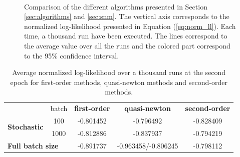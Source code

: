 \documentclass[conference]{IEEEtran}
\begin{document}
\begin{figure}[t]
    \centering
    ~
    ~
    \caption{Comparison of the different algorithms presented in Section \ref{sec:algorithms} and \ref{sec:snm}. The vertical axis corresponds to the normalized log-likelihood presented in Equation (\ref{eq:norm_ll}). Each time, a thousand run have been executed. The lines correspond to the average value over all the runs and the colored part correspond to the 95\% confidence interval.}
    \label{fig:comparison_algo}
    \vspace{-0.5cm}
\end{figure}

\begin{table}
\centering
\renewcommand\arraystretch{1.2}
\begin{tabular}{lc|ccc}
&\multicolumn{1}{c}{batch} & {\bf first-order} & {\bf quasi-newton} & {\bf second-order} \\ \cline{3-5}
\multirow{ 2}{*}{\bf Stochastic} & 100 & -0.801452 & -0.796492 & -0.828409 \\
& 1000 & -0.812886 & -0.837937 & -0.794219 \\
\multicolumn{2}{l|}{\bf Full batch size}  & -0.891737 & -0.963458/-0.806245 & -0.798112
\end{tabular}
\caption{\label{tab:comparison_algo} Average normalized log-likelihood over a thousand runs at the second epoch for first-order methods, quasi-newton methods and second-order methods.}
\vspace{-0.8cm}
\end{table}
\end{document}
